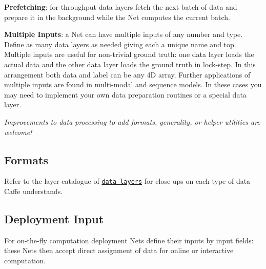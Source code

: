 {\bfseries Prefetching}\+: for throughput data layers fetch the next batch of data and prepare it in the background while the Net computes the current batch.

{\bfseries Multiple Inputs}\+: a Net can have multiple inputs of any number and type. Define as many data layers as needed giving each a unique name and top. Multiple inputs are useful for non-\/trivial ground truth\+: one data layer loads the actual data and the other data layer loads the ground truth in lock-\/step. In this arrangement both data and label can be any 4D array. Further applications of multiple inputs are found in multi-\/modal and sequence models. In these cases you may need to implement your own data preparation routines or a special data layer.

{\itshape Improvements to data processing to add formats, generality, or helper utilities are welcome!}

\subsection*{Formats}

Refer to the layer catalogue of \href{layers.html#data-layers}{\tt data layers} for close-\/ups on each type of data Caffe understands.

\subsection*{Deployment Input}

For on-\/the-\/fly computation deployment Nets define their inputs by {\ttfamily input} fields\+: these Nets then accept direct assignment of data for online or interactive computation. 